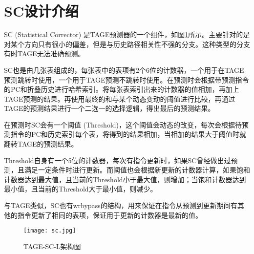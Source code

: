 
\section{SC设计介绍}

SC (Statistical Corrector) 是TAGE预测器的一个组件，如图\ref{fig:figure24}所示。主要针对的是对某个方向只有很小的偏差，但是与历史路径相关性不强的分支\cite{tage-sc-l, isl-tage}。这种类型的分支有时TAGE无法准确预测。

SC也是由几张表组成的，每张表中的表项有2个6位的计数器，一个用于在TAGE预测跳转时使用，一个用于TAGE预测不跳转时使用。在预测时会根据带预测指令的PC和折叠历史进行哈希索引。将每张表索引出来的计数器的值相加，再加上TAGE预测的结果。再使用最终的和与某个动态变动的阈值进行比较，再通过TAGE的预测结果进行一个二选一的选择逻辑，得出最后的预测结果。

在预测时SC会有一个阈值 (Threshold)，这个阈值会动态的改变，每次会根据待预测指令的PC和历史索引每个表，将得到的结果相加，当相加的结果大于阈值时就翻转TAGE的预测结果。

Threshold自身有一个5位的计数器，每次有指令更新时，如果SC曾经做出过预测，且满足一定条件时进行更新。而阈值也会根据新更新的计数器计算，如果饱和计数器达到最大值，且当前的Threshold小于最大值，则增加；当饱和计数器达到最小值，且当前的Threshold大于最小值，则减少。


与TAGE类似，SC也有wrbypass的结构，用来保证在指令从预测到更新期间有其他的指令更新了相同的表项，保证用于更新的计数器是最新的值。

\begin{figure}[htb]
	\centering
	\setlength\tabcolsep{3pt}  %
	\vspace{5pt} %
	\texttt{[image: sc.jpg]}
	\caption{TAGE-SC-L架构图\cite{tage-sc-l}}
	\label{fig:figure24}
\end{figure}

